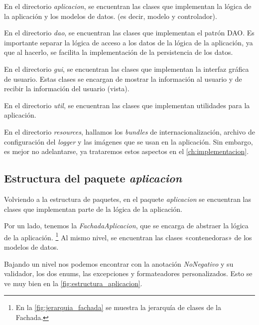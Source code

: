En el directorio \textit{aplicacion}, se encuentran las clases que implementan la lógica de la aplicación
y los modelos de datos.
(es decir, modelo y controlador).

En el directorio \textit{dao}, se encuentran las clases que implementan el patrón DAO\@.
Es importante separar la lógica de acceso a los datos de la lógica de la aplicación,
ya que al hacerlo, se facilita la implementación de la persistencia de los datos.

En el directorio \textit{gui}, se encuentran las clases que implementan la interfaz gráfica de usuario.
Estas clases se encargan de mostrar la información al usuario y de recibir la información del usuario (vista).

En el directorio \textit{util}, se encuentran las clases que implementan utilidades para la aplicación.

En el directorio \textit{resources}, hallamos los \textit{bundles} de internacionalización,
archivo de configuración del \textit{logger} y las imágenes que se usan en la aplicación.
Sin embargo, es mejor no adelantarse, ya trataremos estos aspectos en el \autoref{ch:implementacion}.

\newpage

\subsection{Estructura del paquete \textit{aplicacion}}\label{subsec:estructura_del_paquete_aplicacion}
Volviendo a la estructura de paquetes, en el paquete \textit{aplicacion} se encuentran las clases que implementan parte de la lógica de la aplicación.

Por un lado, tenemos la \textit{FachadaAplicacion}, que se encarga de abstraer la lógica de la aplicación. \footnote{ En la \autoref{fig:jerarquia_fachada} se muestra la jerarquía de clases de la Fachada.}
Al mismo nivel, se encuentran las clases «contenedoras» de los modelos de datos.

Bajando un nivel nos podemos encontrar con la anotación \textit{NoNegativo} y su validador,
los dos enums, las excepciones y formateadores personalizados.
Esto se ve muy bien en la \autoref{fig:estructura_aplicacion}.

